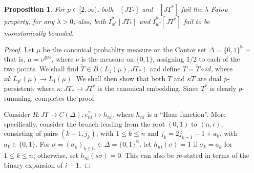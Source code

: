 \documentclass{amsart}
\theoremstyle{plain}
\newtheorem{proposition}[theorem]{Proposition}
\theoremstyle{definition}
\numberwithin{equation}{section}
\newcommand{\N}{\mathbb{N}}
\DeclareMathOperator{\FBLp}{FBL^{\mathit{(p)}}}
\newcommand{\Ip}{\overline{I}_{w^*}^{p}}
\begin{document}
\begin{proposition}\label{JT*-Fatou}
For $p \in [2,\infty)$, both $\FBLp[JT_*]$ and $\FBLp[JT^*]$ fail the $\lambda$-Fatou property, for any $\lambda > 0$; also, both $\Ip[JT_*]$ and $\Ip[JT^*]$ fail to be monotonically bounded.
\end{proposition}

\begin{proof}
Let $\mu$ be the canonical probablity measure on the Cantor set $\Delta = \{0,1\}^{\N}$ -- that is, $\mu = \nu^{\otimes \N}$, where $\nu$ is the measure on $\{0,1\}$, assigning $1/2$ to each of the two points.
We shall find $\widetilde{T} \in B(L_1(\mu), JT_*)$ and define $T = \widetilde{T} \circ id$, where $id : L_{p'}(\mu) \to L_1(\mu)$. We shall then show that both $T$ and $\kappa T$ are dual $p$-persistent, where $\kappa : JT_* \to JT^*$ is the canonical embedding. Since $T^*$ is clearly $p$-summing,  completes the proof.

Consider $R : JT \to C(\Delta) : e_{ni}^* \mapsto h_{ni}$, where $h_{ni}$ is a ``Haar function''.
More specifically, consider the branch leading from the root $(0,1)$ to $(n,i)$, consisting of pairs $(k-1,j_k)$, with $1 \leq k \leq n$ and $j_k = 2j_{k-1} - 1 + a_k$, with $a_k \in \{0,1\}$. For $\sigma = (\sigma_k)_{k \in \N} \in \Delta = \{0,1\}^\N$, let $h_{ni}(\sigma) = 1$ if $\sigma_k = a_k$ for $1 \leq k \leq n$; otherwise, set $h_{ni}(s\sigma) = 0$. This can also be re-stated in terms of the binary expansion of $i-1$.
	

\end{proof}
\end{document}
